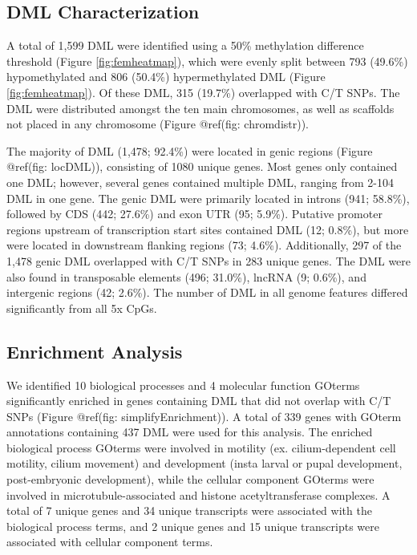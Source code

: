 \documentclass [11pt, proquest] {uwthesis}[2015/03/03]
\begin{document}
\hypertarget{dml-characterization-1}{%
\subsection{DML Characterization}\label{dml-characterization-1}}

A total of 1,599 DML were identified using a 50\% methylation difference threshold (Figure \ref{fig:femheatmap}), which were evenly split between 793 (49.6\%) hypomethylated and 806 (50.4\%) hypermethylated DML (Figure \ref{fig:femheatmap}). Of these DML, 315 (19.7\%) overlapped with C/T SNPs. The DML were distributed amongst the ten main chromosomes, as well as scaffolds not placed in any chromosome (Figure @ref(fig: chromdistr)).

The majority of DML (1,478; 92.4\%) were located in genic regions (Figure @ref(fig: locDML)), consisting of 1080 unique genes. Most genes only contained one DML; however, several genes contained multiple DML, ranging from 2-104 DML in one gene. The genic DML were primarily located in introns (941; 58.8\%), followed by CDS (442; 27.6\%) and exon UTR (95; 5.9\%). Putative promoter regions upstream of transcription start sites contained DML (12; 0.8\%), but more were located in downstream flanking regions (73; 4.6\%). Additionally, 297 of the 1,478 genic DML overlapped with C/T SNPs in 283 unique genes. The DML were also found in transposable elements (496; 31.0\%), lncRNA (9; 0.6\%), and intergenic regions (42; 2.6\%). The number of DML in all genome features differed significantly from all 5x CpGs.

\hypertarget{enrichment-analysis-1}{%
\subsection{Enrichment Analysis}\label{enrichment-analysis-1}}

We identified 10 biological processes and 4 molecular function GOterms significantly enriched in genes containing DML that did not overlap with C/T SNPs (Figure @ref(fig: simplifyEnrichment)). A total of 339 genes with GOterm annotations containing 437 DML were used for this analysis. The enriched biological process GOterms were involved in motility (ex. cilium-dependent cell motility, cilium movement) and development (insta larval or pupal development, post-embryonic development), while the cellular component GOterms were involved in microtubule-associated and histone acetyltransferase complexes. A total of 7 unique genes and 34 unique transcripts were associated with the biological process terms, and 2 unique genes and 15 unique transcripts were associated with cellular component terms.
\end{document}
